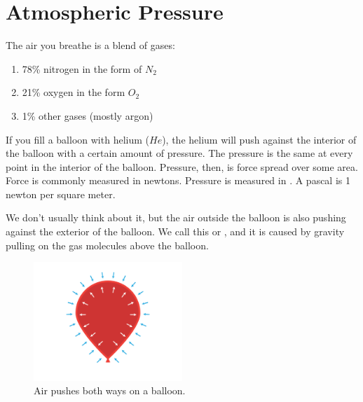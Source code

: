 \chapter{Atmospheric Pressure}

The air you breathe is a blend of gases:
\begin{enumerate}
\item 78\% nitrogen in the form of $N_2$
\item 21\% oxygen in the form $O_2$
\item 1\% other gases (mostly argon)
\end{enumerate}

If you fill a balloon with helium ($He$),  the helium will push against the interior of the balloon with a certain amount of pressure.   
The pressure is the same at every point in the interior of the balloon.  Pressure,  then,  is force spread over some area.   
Force is commonly measured in newtons. Pressure is measured in . A pascal is 1 newton per square meter.

We don't usually think about it,  but the air outside the balloon is also pushing against the exterior of the balloon.  
We call this  or , and it is caused by gravity pulling on the gas molecules above the balloon.

\begin{figure}[htbp]
    \centering
    \includegraphics[width=0.5\textwidth]{balloon.png}
    \caption{Air pushes both ways on a balloon.}
    \label{fig:balloon}
\end{figure}


